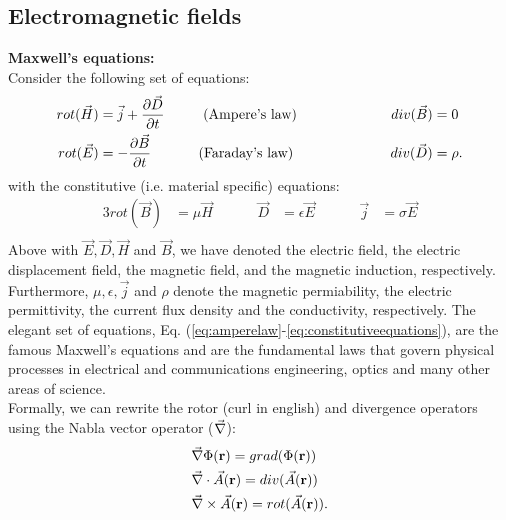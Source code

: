 \documentclass[10pt,a4paper]{report}
\def\Nabla{\ensuremath\vec{\nabla}}
\def\bm{\ensuremath\mathbf}
\def\curl{\ensuremath\Nabla\times}
\def\div{\ensuremath\Nabla\cdot}
\begin{document}
\subsection{Electromagnetic fields}
\textbf{Maxwell's equations:} 
\\
Consider the following set of equations: 
\begin{alignat}{3}
  rot ( \vec{H} ) &= \vec{j}+\frac{\partial \vec{D}}{\partial t} &\hspace{0.5cm} &\text{ (Ampere's law)} &\hspace{2cm} div (\vec{B}) &= 0 \label{eq:amperelaw}\\
  rot ( \vec{E} ) &= -\frac{\partial \vec{B}}{\partial t} &\hspace{0.5cm} &\text{(Faraday's law)} &\hspace{2cm} div (\vec{D}) &= \rho \label{eq:faradaylaw}. 
\end{alignat}
with the constitutive (i.e. material specific) equations: 
\begin{alignat}{3}
  \label{eq:constitutiveequations}
   rot  ( \vec{B} ) &= \mu \vec{H} &\hspace{1cm}  \vec{D} &= \epsilon \vec{E} &\hspace{1cm}  \vec{j} &= \sigma \vec{E} \\
\end{alignat}
Above with $\vec{E},\vec{D}, \vec{H}$ and $\vec{B}$, we have denoted the electric field, the electric displacement field, the magnetic field, and the magnetic induction, respectively. Furthermore, $\mu ,\epsilon ,\vec{j} $ and $\rho$ denote the magnetic permiability, the electric permittivity, the current flux density and the conductivity, respectively. The elegant set of equations, Eq. (\ref{eq:amperelaw}-\ref{eq:constitutiveequations}), are the famous Maxwell's equations and are the fundamental laws that govern physical processes in electrical and communications engineering, optics and many other areas of science.\\

Formally, we can rewrite the rotor (curl in english) and divergence operators using the Nabla vector operator ($\Nabla$):
\begin{align*}
  & \Nabla \Phi(\bm{r})  = grad (\Phi( \bm{r} )) \\
  & \div \vec{A}(\bm{r}) = div (\vec{A}(\bm{r})) \\ 
  & \curl \vec{A}(\bm{r}) = rot (\vec{A}( \bm{r} )).
\end{align*}
\end{document}
